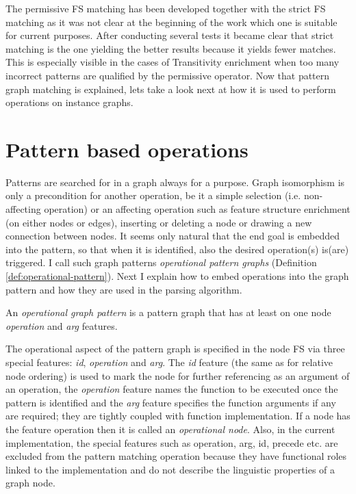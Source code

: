     The permissive FS matching has been developed together with the strict FS matching as it was not clear at the beginning of the work which one is suitable for current purposes. After conducting several tests it became clear that strict matching is the one yielding the better results because it yields fewer matches. This is especially visible in the cases of Transitivity enrichment when too many incorrect patterns are qualified by the permissive operator. Now that pattern graph matching is explained, lets take a look next at how it is used to perform operations on instance graphs.

\section{Pattern based operations}
\label{sec:pattern-based-operations}

    Patterns are searched for in a graph always for a purpose. Graph isomorphism is only a precondition for another operation, be it a simple selection (i.e. non-affecting operation) or an affecting operation such as feature structure enrichment (on either nodes or edges), inserting or deleting a node or drawing a new connection between nodes. It seems only natural that the end goal is embedded into the pattern, so that when it is identified, also the desired operation(s) is(are) triggered. I call such graph patterns \textit{operational pattern graphs} (Definition \ref{def:operational-pattern}). Next I explain how to embed  operations into the graph pattern and how they are used in the parsing algorithm. 

        \begin{definition}\label{def:operational-pattern}
            An \textit{operational graph pattern} is a pattern graph that has at least on one node \textit{operation} and \textit{arg} features.
        \end{definition}

    The operational aspect of the pattern graph is specified in the node FS via three special features: \textit{id}, \textit{operation} and \textit{arg}. The \textit{id} feature (the same as for relative node ordering) is used to mark the node for further referencing as an argument of an operation, the \textit{operation} feature names the function to be executed once the pattern is identified and the \textit{arg} feature specifies the function arguments if any are required; they are tightly coupled with function implementation. If a node has the feature operation then it is called an \textit{operational node}. Also, in the current implementation, the special features such as operation, arg, id, precede etc. are excluded from the pattern matching operation because they have functional roles linked to the implementation and do not describe the linguistic properties of a graph node.

